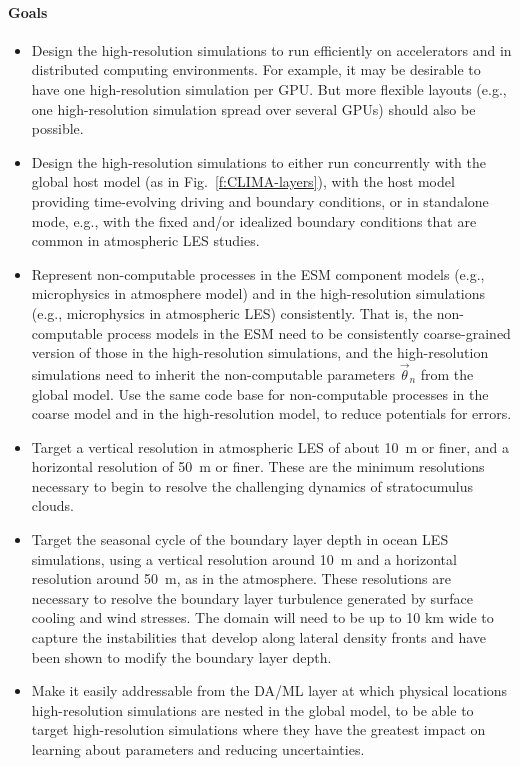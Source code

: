 \documentclass{article}
\begin{document}
\paragraph{Goals}
\begin{itemize}
    \item Design the high-resolution simulations to run efficiently on accelerators and in distributed computing environments.  For example, it may be desirable to have one high-resolution simulation per GPU. But more flexible layouts (e.g., one high-resolution simulation spread over several GPUs) should also be possible.
    \item Design the high-resolution simulations to either run concurrently with the global host model (as in Fig.~\ref{f:CLIMA-layers}), with the host model providing time-evolving driving and boundary conditions, or in standalone mode, e.g., with the fixed and/or idealized boundary conditions that are common in atmospheric LES studies. 
    \item Represent non-computable processes in the ESM component models (e.g., microphysics in atmosphere model) and in the high-resolution simulations (e.g., microphysics in atmospheric LES) consistently. That is, the non-computable process models in the ESM need to be consistently coarse-grained version of those in the high-resolution simulations, and the high-resolution simulations need to inherit the non-computable parameters $\vec{\theta}_n$ from the global model. Use the same code base for non-computable processes in the coarse model and in the high-resolution model, to reduce potentials for errors.
    \item Target a vertical resolution in atmospheric LES of about 10~m or finer, and a horizontal resolution of 50~m or finer. These are the minimum resolutions necessary to begin to resolve the challenging dynamics of stratocumulus clouds. 
    \item Target the seasonal cycle of the boundary layer depth in ocean LES simulations, using a vertical resolution around 10~m and a horizontal resolution around 50~m, as in the atmosphere. These resolutions are necessary to resolve the boundary layer turbulence generated by surface cooling and wind stresses. The domain will need to be up to 10 km wide to capture the instabilities that develop along lateral density fronts and have been shown to modify the boundary layer depth.
    \item Make it easily addressable from the DA/ML layer at which physical locations high-resolution simulations are nested in the global model, to be able to target high-resolution simulations where they have the greatest impact on learning about parameters and reducing uncertainties. 
\end{itemize}
\end{document}
